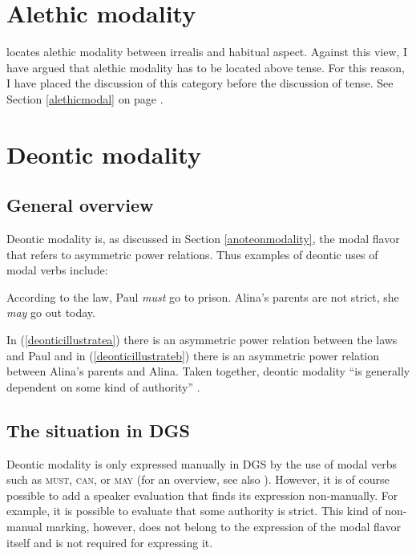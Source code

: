 \section{Alethic modality}
\citet{cinque1999adverbs} locates alethic modality between irrealis   and habitual aspect. Against this view, I have argued that alethic modality has to be located above tense. For this reason, I have placed the discussion of this category before the discussion of tense. See Section \ref{alethicmodal} on page \pageref{alethicmodal}.

\section{Deontic modality}\label{deonticmodalsection}


\subsection{General overview}

Deontic modality is, as discussed in Section \ref{anoteonmodality}, the modal flavor that refers to asymmetric power relations. Thus examples of deontic uses of modal verbs include:

\begin{exe}
\ex\label{deonticillustrate}\begin{xlist}
\ex According to the law, Paul \textit{must} go to prison.\label{deonticillustratea}
\ex Alina's parents are not strict, she \textit{may} go out today.\label{deonticillustrateb}
\end{xlist}
\end{exe} 

\noindent In (\ref{deonticillustratea}) there is an asymmetric power relation between the laws and Paul and in (\ref{deonticillustrateb}) there is an asymmetric power relation between Alina's parents and Alina. Taken together, deontic modality ``is generally dependent on some kind of authority'' \citep[70]{palmer2001mood}.

\subsection{The situation in DGS}
Deontic modality is only expressed manually in DGS by the use of modal verbs such as \textsc{must}, \textsc{can}, or \textsc{may} (for an overview, see also \citealt{pfauquer2007syntaxofnegationandmodals}). However, it is of course possible to add a speaker evaluation that finds its expression non-manually. For example, it is possible to evaluate that some authority is strict. This kind of non-manual marking, however, does not belong to the expression of the modal flavor itself and is not required for expressing it.

